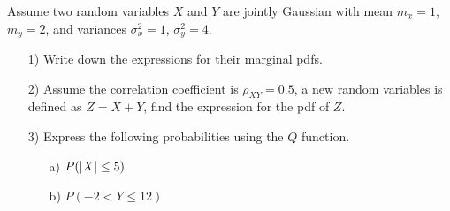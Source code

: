 \documentclass{assignment}
\begin{document}
\begin{prob}
    Assume two random variables $X$ and $Y$ are jointly Gaussian with mean $m_x=1$, $m_y=2$, and variances $\sigma_x^2=1$, $\sigma_y^2=4$.
    \begin{itemize}
        \item[1)] Write down the expressions for their marginal pdfs.
        \item[2)] Assume the correlation coefficient is $\rho_{XY}=0.5$, a new random variables is defined as $Z=X+Y$, find the expression for the pdf of $Z$.
        \item[3)] Express the following probabilities using the $Q$ function.
        \begin{itemize}
            \item[a)] $P(\left\lvert X\right\rvert\leq 5)$
            \item[b)] $P(-2<Y\leq 12)$
        \end{itemize}
    \end{itemize}
\end{prob}
\end{document}

